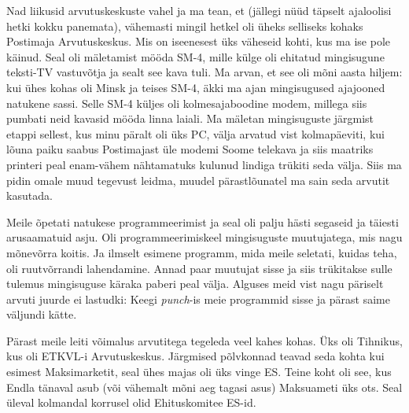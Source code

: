 Nad liikusid arvutuskeskuste vahel ja ma tean, et (jällegi nüüd täpselt 
ajaloolisi hetki kokku panemata), vähemasti mingil hetkel oli üheks selliseks 
kohaks Postimaja Arvutuskeskus. Mis on 
iseenesest üks väheseid kohti, kus ma ise pole käinud. Seal oli mäletamist 
mööda SM-4, mille külge oli ehitatud mingisugune teksti-TV 
vastuvõtja  ja sealt see kava tuli. Ma arvan, et see oli mõni aasta hiljem: kui 
ühes kohas oli Minsk ja teises SM-4, äkki ma ajan mingisugused ajajooned 
natukene sassi. Selle SM-4  küljes oli kolmesajaboodine modem, millega siis 
pumbati neid kavasid mööda linna laiali. Ma mäletan mingisuguste järgmist 
etappi sellest, kus  minu päralt oli üks PC, välja arvatud vist kolmapäeviti, 
kui lõuna paiku saabus Postimajast üle modemi Soome telekava ja siis maatriks 
printeri peal enam-vähem nähtamatuks kulunud lindiga trükiti seda välja. Siis 
ma pidin omale  muud tegevust leidma, muudel pärastlõunatel ma sain seda 
arvutit kasutada.


Meile õpetati natukese programmeerimist ja seal oli palju hästi segaseid ja 
täiesti arusaamatuid asju. Oli programmeerimiskeel mingisuguste  muutujatega, 
mis nagu mõnevõrra koitis. Ja  ilmselt esimene programm, mida meile seletati, 
kuidas teha, oli ruutvõrrandi lahendamine. Annad paar muutujat sisse ja siis 
trükitakse sulle tulemus mingisuguse käraka  paberi peal välja. Alguses meid 
vist nagu päriselt arvuti juurde ei lastudki: Keegi  \emph{punch}-is meie 
programmid sisse ja pärast saime väljundi kätte. 

Pärast meile leiti võimalus arvutitega tegeleda veel kahes kohas. Üks oli 
Tihnikus, kus oli ETKVL-i Arvutuskeskus. Järgmised 
põlvkonnad teavad seda kohta kui esimest Maksimarketit, seal ühes majas oli üks 
vinge ES. Teine koht oli see, kus Endla tänaval asub (või 
vähemalt mõni aeg tagasi asus) Maksuameti üks ots. Seal  üleval kolmandal 
korrusel olid Ehituskomitee ES-id. 


